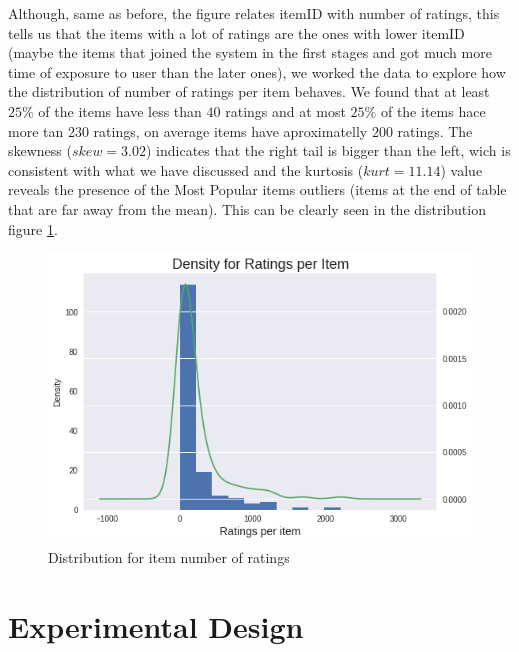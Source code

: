 \documentclass[letterpaper, 10 pt, conference]{ieeeconf}  %
\begin{document}
\begin{enumerate}
\begin{itemize}
        Although, same as before, the figure relates itemID with number of ratings, this tells us that the items with a lot of ratings are the ones with lower itemID (maybe the items that joined the system in the first stages and got much more time of exposure to user than the later ones), we worked the data to explore how the distribution of number of ratings per item behaves. We found that at least $25\%$ of the items have less than $40$ ratings and at most $25\%$ of the items hace more tan 230 ratings, on average items have aproximatelly $200$ ratings. The skewness ($skew=3.02$) indicates that the right tail is bigger than the left, wich is consistent with what we have discussed and the kurtosis ($kurt=11.14$) value reveals the presence of the Most Popular items outliers (items at the end of table that are far away from the mean). This can be clearly seen in the distribution figure \ref{fig:ratings-per-item-density}.
        
        \begin{figure}[h]
            \includegraphics[scale=0.4]{ratings-per-item-density.png}
            \centering
            \caption{Distribution for item number of ratings}
            \label{fig:ratings-per-item-density}
        \end{figure}
        
    \end{itemize}
    
\end{enumerate}

\section{Experimental Design}
\end{document}
